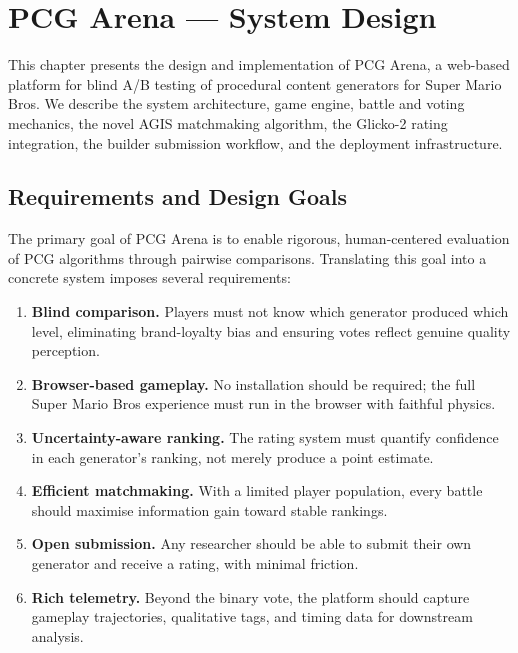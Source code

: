 \documentclass[shortabstract, mgr, english]{iithesis}
\begin{document}
\chapter{PCG Arena --- System Design}
\label{ch:system-design}

This chapter presents the design and implementation of PCG Arena, a web-based platform for
blind A/B testing of procedural content generators for Super Mario Bros. We describe the
system architecture, game engine, battle and voting mechanics, the novel AGIS matchmaking
algorithm, the Glicko-2 rating integration, the builder submission workflow, and the
deployment infrastructure.

\section{Requirements and Design Goals}
\label{sec:sd-requirements}

The primary goal of PCG Arena is to enable rigorous, human-centered evaluation of PCG
algorithms through pairwise comparisons. Translating this goal into a concrete system
imposes several requirements:

\begin{enumerate}
    \item \textbf{Blind comparison.} Players must not know which generator produced which
          level, eliminating brand-loyalty bias and ensuring votes reflect genuine quality
          perception.
    \item \textbf{Browser-based gameplay.} No installation should be required; the full
          Super Mario Bros experience must run in the browser with faithful physics.
    \item \textbf{Uncertainty-aware ranking.} The rating system must quantify confidence
          in each generator's ranking, not merely produce a point estimate.
    \item \textbf{Efficient matchmaking.} With a limited player population, every battle
          should maximise information gain toward stable rankings.
    \item \textbf{Open submission.} Any researcher should be able to submit their own
          generator and receive a rating, with minimal friction.
    \item \textbf{Rich telemetry.} Beyond the binary vote, the platform should capture
          gameplay trajectories, qualitative tags, and timing data for downstream analysis.
\end{enumerate}
\end{document}
